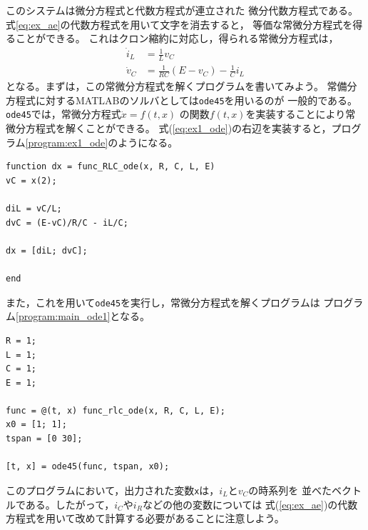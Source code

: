 {\begin{例}[簡単な例題]
このシステムは微分方程式と代数方程式が連立された
微分代数方程式である。
式\ref{eq:ex_ae}の代数方程式を用いて文字を消去すると，
等価な常微分方程式を得ることができる。
これはクロン縮約に対応し，得られる常微分方程式は，
\begin{subequations}\label{eq:ex1_ode}
  \begin{align}
    \dot{i}_L & = \frac{1}{L}v_C                     \\
    \dot{v}_C & = \frac{1}{RC}(E-v_C)-\frac{1}{C}i_L
  \end{align}
\end{subequations}
となる。まずは，この常微分方程式を解くプログラムを書いてみよう。
常備分方程式に対するMATLABのソルバとしては\verb|ode45|を用いるのが
一般的である。\verb|ode45|では，常微分方程式$\dot{x} = f(t, x)$
の関数$f(t, x)$を実装することにより常微分方程式を解くことができる。
式(\ref{eq:ex1_ode})の右辺を実装すると，プログラム\ref{program:ex1_ode}のようになる。
\begin{PROGRAMA}[count,title={func\_RLC\_ode.m}]\label{program:ex1_ode}
  \begin{verbatim}
function dx = func_RLC_ode(x, R, C, L, E)
vC = x(2);

diL = vC/L;
dvC = (E-vC)/R/C - iL/C;

dx = [diL; dvC];

end
\end{verbatim}
\end{PROGRAMA}
また，これを用いて\verb|ode45|を実行し，常微分方程式を解くプログラムは
プログラム\ref{program:main_ode1}となる。
\begin{PROGRAMA}[count,title={main\_RLC\_ode.m}]\label{program:main_ode1}
  \begin{verbatim}
R = 1;
L = 1;
C = 1;
E = 1;

func = @(t, x) func_rlc_ode(x, R, C, L, E);
x0 = [1; 1];
tspan = [0 30];

[t, x] = ode45(func, tspan, x0);
\end{verbatim}
\end{PROGRAMA}
このプログラムにおいて，出力された変数\verb|x|は，$i_L$と$v_C$の時系列を
並べたベクトルである。したがって，$i_C$や$i_R$などの他の変数については
式(\ref{eq:ex_ae})の代数方程式を用いて改めて計算する必要があることに注意しよう。


\end{例}}
